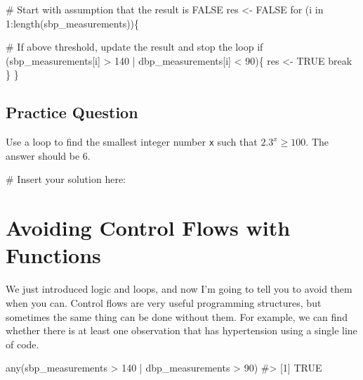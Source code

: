 \documentclass[
  letterpaper,
]{latex/krantz}
\makeatletter
\newenvironment{Shaded}{\begin{snugshade}}{\end{snugshade}}
\newcommand{\CommentTok}[1]{\textcolor[rgb]{0.37,0.37,0.37}{#1}}
\newcommand{\ConstantTok}[1]{\textcolor[rgb]{0.56,0.35,0.01}{#1}}
\newcommand{\ControlFlowTok}[1]{\textcolor[rgb]{0.00,0.23,0.31}{#1}}
\newcommand{\DecValTok}[1]{\textcolor[rgb]{0.68,0.00,0.00}{#1}}
\newcommand{\FunctionTok}[1]{\textcolor[rgb]{0.28,0.35,0.67}{#1}}
\newcommand{\NormalTok}[1]{\textcolor[rgb]{0.00,0.23,0.31}{#1}}
\newcommand{\OtherTok}[1]{\textcolor[rgb]{0.00,0.23,0.31}{#1}}
\newcommand{\SpecialCharTok}[1]{\textcolor[rgb]{0.37,0.37,0.37}{#1}}
\newenvironment{kframe}{%
\medskip{}
\setlength{\fboxsep}{.8em}
 \def\at@end@of@kframe{}%
 \ifinner\ifhmode%
  \def\at@end@of@kframe{\end{minipage}}%
  \begin{minipage}{\columnwidth}%
 \fi\fi%
 \def\FrameCommand##1{\hskip\@totalleftmargin \hskip-\fboxsep
 \colorbox{shadecolor}{##1}\hskip-\fboxsep
     \hskip-\linewidth \hskip-\@totalleftmargin \hskip\columnwidth}%
 \MakeFramed {\advance\hsize-\width
   \@totalleftmargin\z@ \linewidth\hsize
   \@setminipage}}%
 {\par\unskip\endMakeFramed%
 \at@end@of@kframe}
\renewenvironment{Shaded}{\begin{kframe}}{\end{kframe}}
\makeatother
\begin{document}
\begin{Shaded}
\begin{Highlighting}[]
\CommentTok{\# Start with assumption that the result is FALSE}
\NormalTok{res }\OtherTok{\textless{}{-}} \ConstantTok{FALSE}
\ControlFlowTok{for}\NormalTok{ (i }\ControlFlowTok{in} \DecValTok{1}\SpecialCharTok{:}\FunctionTok{length}\NormalTok{(sbp\_measurements))\{}
  
  \CommentTok{\# If above threshold, update the result and stop the loop}
  \ControlFlowTok{if}\NormalTok{ (sbp\_measurements[i] }\SpecialCharTok{\textgreater{}} \DecValTok{140} \SpecialCharTok{|}\NormalTok{ dbp\_measurements[i] }\SpecialCharTok{\textless{}} \DecValTok{90}\NormalTok{)\{}
\NormalTok{    res }\OtherTok{\textless{}{-}} \ConstantTok{TRUE}
    \ControlFlowTok{break} 
\NormalTok{  \}}
\NormalTok{\}}
\end{Highlighting}
\end{Shaded}

\subsection{Practice Question}\label{practice-question-26}

Use a loop to find the smallest integer number \texttt{x} such that
\(2.3^x \geq 100\). The answer should be 6.

\begin{Shaded}
\begin{Highlighting}[]
\CommentTok{\# Insert your solution here:}
\end{Highlighting}
\end{Shaded}

\section{Avoiding Control Flows with
Functions}\label{avoiding-control-flows-with-functions}

We just introduced logic and loops, and now I'm going to tell you to
avoid them when you can. Control flows are very useful programming
structures, but sometimes the same thing can be done without them. For
example, we can find whether there is at least one observation that has
hypertension using a single line of code.

\begin{Shaded}
\begin{Highlighting}[]
\FunctionTok{any}\NormalTok{(sbp\_measurements }\SpecialCharTok{\textgreater{}} \DecValTok{140} \SpecialCharTok{|}\NormalTok{ dbp\_measurements }\SpecialCharTok{\textgreater{}} \DecValTok{90}\NormalTok{)}
\CommentTok{\#\textgreater{} [1] TRUE}
\end{Highlighting}
\end{Shaded}
\end{document}

